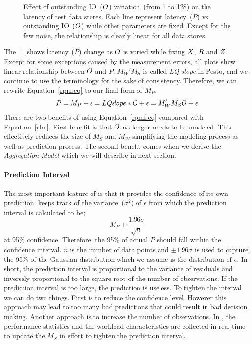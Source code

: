 \begin{figure}[!t]
\caption{Effect of outstanding IO~($O$) variation~(from 1 to 128) on the latency of test data stores.
Each line represent latency~($P$) vs. outstanding IO~($O$) while other parameters are fixed.
Except for the few noise, the relationship is clearly linear for all data stores.
}
\label{oioParam}
\end{figure}
The \figurename~\ref{oioParam} shows latency~($P$) change as $O$ is varied while fixing $X$, $R$ and $Z$.
Except for some exceptions caused by the measurement errors, all plots show linear relationship between $O$ and $P$.
$M_W'M_S$ is called \emph{LQ-slope} in Pesto, and we continue to use the terminology for the sake of consistency.
Therefore, we can rewrite Equation~\ref{rpm:eq} to our final form of $M_P$.
\begin{equation}\label{rpmf:eq}
P=M_P+\epsilon=\mathit{LQslope}*O+\epsilon=M_W'M_SO+\epsilon
\end{equation}
There are two benefits of using Equation~\ref{rpmf:eq} compared with Equation~\ref{rlm}.
First benefit is that $O$ no longer needs to be modeled.
This effectively reduces the size of $M_S$ and $M_W$ simplifying the modeling process as well as prediction process.
The second benefit comes when we derive the \emph{\romano Aggregation Model} which we will describe in next section.

\paragraph{Prediction Interval}
The most important feature of \romano is that it provides the confidence of its own prediction.
\romano keeps track of the variance~($\sigma^2$) of $\epsilon$ from which the prediction interval is calculated to be;
\begin{equation}\label{ci}
M_P\pm\frac{1.96\sigma}{\sqrt{n}}
\end{equation}
at 95\% confidence.
Therefore, the 95\% of actual $P$ should fall within the confidence interval.
$n$ is the number of data points and $\pm1.96\sigma$ is used to capture the 95\% of the Gaussian distribution which we assume is the distribution of $\epsilon$.
In short, the prediction interval is proportional to the variance of residuals and inversely proportional to the square root of the number of observations.
If the prediction interval is too large, the prediction is useless.
To tighten the interval we can do two things.
First is to reduce the confidence level.
However this approach may lead to too many bad predictions that could result in bad decision making.
Another approach is to increase the number of observations.
In \romano, the performance statistics and the workload characteristics are collected in real time to update the $M_S$ in effort to tighten the prediction interval.

